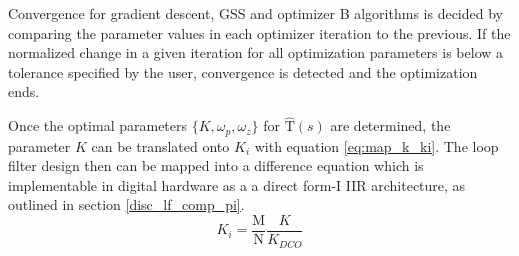 Convergence for gradient descent, GSS and optimizer B algorithms is decided by comparing the parameter values in each optimizer iteration to the previous. If the normalized change in a given iteration for all optimization parameters is below a tolerance specified by the user, convergence is detected and the optimization ends. 

Once the optimal parameters $\{K, \omega_p, \omega_z\}$ for $\mathrm{\hat{T}}(s)$ are determined, the parameter $K$ can be translated onto $K_i$ with equation \ref{eq:map_k_ki}. The loop filter design then can be mapped into a difference equation which is implementable in digital hardware as a a direct form-I IIR architecture, as outlined in section \ref{disc_lf_comp_pi}.
\begin{equation}\label{eq:map_k_ki}
K_i=\frac{\mathrm{M}}{\mathrm{N}}\frac{K}{K_{DCO}}
\end{equation}


